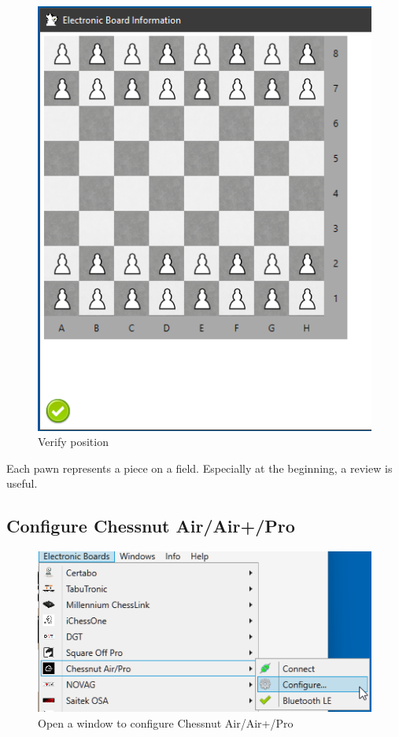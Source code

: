 \documentclass[11pt,a4paper]{article}
\begin{document}
\begin{figure}[H]
	\centering
	\includegraphics[scale=0.8]{Pegasus5.png}
	\caption{Verify position}
	\label{fig:Pegasus5}
\end{figure}

Each pawn represents a piece on a field. Especially at the beginning, a review is useful. 

\subsection{Configure Chessnut Air/Air+/Pro} \label{ConfigureChessnutAir}
\begin{figure}[H]
	\centering
	\includegraphics[scale=0.8]{ChessnutAir5.png}
	\caption{Open a window to configure Chessnut Air/Air+/Pro}
	\label{fig:ChessnutAir5}
\end{figure}
\end{document}

